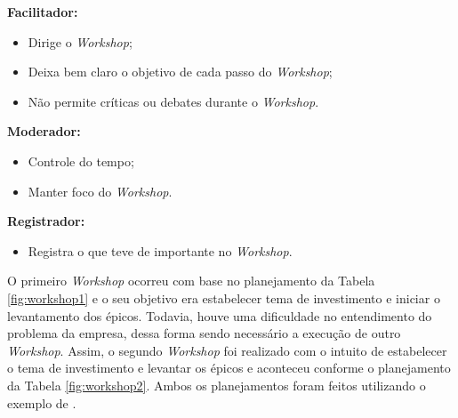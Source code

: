 \textbf{Facilitador:}

  \begin{itemize}
	\item Dirige o \textit{Workshop};
	\item Deixa bem claro o objetivo de cada passo do \textit{Workshop};
	\item Não permite críticas ou debates durante o \textit{Workshop}.
	\end{itemize}

\textbf{Moderador:}

  \begin{itemize}
	\item Controle do tempo;
	\item Manter foco do \textit{Workshop}.
	\end{itemize}

\textbf{Registrador:}
  
  \begin{itemize}
	\item Registra o que teve de importante no \textit{Workshop}.
	\end{itemize}
O primeiro \textit{Workshop} ocorreu com base no planejamento da Tabela \ref{fig:workshop1} e o seu objetivo
era estabelecer tema de investimento e iniciar o levantamento dos épicos. Todavia, houve uma dificuldade no entendimento
do problema da empresa, dessa forma sendo necessário a execução de outro \textit{Workshop}. 
Assim, o segundo \textit{Workshop} foi realizado com o intuito de estabelecer o tema de investimento e levantar os épicos e aconteceu conforme o planejamento da Tabela
\ref{fig:workshop2}. Ambos os planejamentos foram feitos utilizando o exemplo de .

